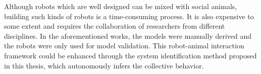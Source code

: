 Although robots which are well designed can be mixed with social animals, building such kinds of robots is a time-consuming process. It is also expensive to some extent and requires the collaboration of researchers from different disciplines. In the aforementioned works, the models were manually derived and the robots were only used for model validation. This robot-animal interaction framework could be enhanced through the system identification method proposed in this thesis, which autonomously infers the collective behavior. 

\clearpage 

